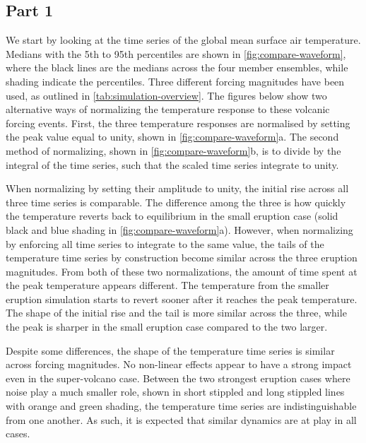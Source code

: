\documentclass[twocol]{ametsocV6.1}
\begin{document}
\subsection{Part 1}

We start by looking at the time series of the global mean surface air temperature.
Medians with the 5th to 95th percentiles are shown in \ref{fig:compare-waveform}, where
the black lines are the medians across the four member ensembles, while shading indicate
the percentiles. Three different forcing magnitudes have been used, as outlined in
\ref{tab:simulation-overview}. The figures below show two alternative ways of
normalizing the temperature response to these volcanic forcing events. First, the three
temperature responses are normalised by setting the peak value equal to unity, shown in
\ref{fig:compare-waveform}a. The second method of normalizing, shown in
\ref{fig:compare-waveform}b, is to divide by the integral of the time series,
such that the scaled time series integrate to unity.

When normalizing by setting their amplitude to unity, the initial rise across all three
time series is comparable. The difference among the three is how quickly the temperature
reverts back to equilibrium in the small eruption case (solid black and blue shading in
\ref{fig:compare-waveform}a). However, when normalizing by enforcing all time series
to integrate to the same value, the tails of the temperature time series by construction
become similar across the three eruption magnitudes. From both of these two
normalizations, the amount of time spent at the peak temperature appears different. The
temperature from the smaller eruption simulation starts to revert sooner after it
reaches the peak temperature. The shape of the initial rise and the tail is more similar
across the three, while the peak is sharper in the small eruption case compared to the
two larger.

Despite some differences, the shape of the temperature time series is similar across
forcing magnitudes. No non-linear effects appear to have a strong impact even in the
super-volcano case. Between the two strongest eruption cases where noise play a much
smaller role, shown in short stippled and long stippled lines with orange and green
shading, the temperature time series are indistinguishable from one another. As such, it
is expected that similar dynamics are at play in all cases.

\end{document}
